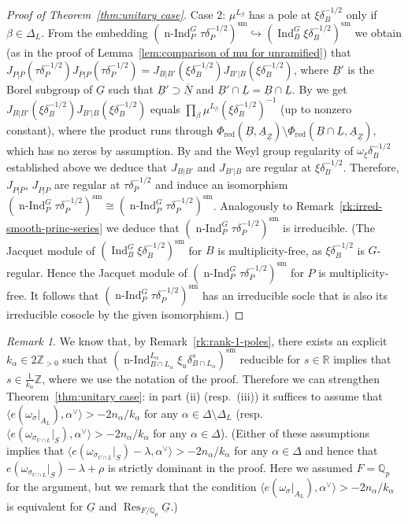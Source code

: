 \documentclass[a4paper]{amsart}
\numberwithin{equation}{section}
\theoremstyle{remark}
\newtheorem{remark}[thm]{Remark}
\theoremstyle{definition}
\DeclareMathOperator{\Ind}{Ind}
\DeclareMathOperator{\nInd}{n-Ind}
\DeclareMathOperator{\Res}{Res}
\newcommand{\Z}{\mathbb{Z}}
\newcommand{\Q}{\mathbb{Q}}
\newcommand{\R}{\mathbb{R}}
\newcommand{\sm}{\mathrm{sm}}
\newcommand{\alggrp}[1]{\underline{#1}}
\newcommand{\red}{\mathrm{red}}
\newcommand{\into}{\hookrightarrow}
\begin{document}
\begin{proof}[Proof of Theorem~\ref{thm:unitary case}]
  Case 2: $\mu^{L_\beta}$ has a pole at $\xi \delta_B^{-1/2}$ only if $\beta \in \Delta_L$.
  From the embedding $(\nInd_P^G \tau\delta_P^{-1/2})^\sm\into(\Ind_B^G \xi\delta_B^{-1/2})^\sm$ we obtain
  (as in the proof of Lemma~\ref{lem:comparison of mu for unramified}) that $J_{P|\overline P}(\tau\delta_P^{-1/2}) J_{\overline P|P}(\tau\delta_P^{-1/2}) = J_{B|B'}(\xi\delta_B^{-1/2})J_{B'|B}(\xi\delta_B^{-1/2})$,
  where $\alggrp B'$ is the Borel subgroup of $\alggrp G$ such that $\alggrp B' \supset \overline {\alggrp N}$ and $\alggrp B' \cap \alggrp L = \alggrp B \cap \alggrp L$.
  By \cite[IV.3(4)]{MR1989693} we get $J_{B|B'}(\xi\delta_B^{-1/2})J_{B'|B}(\xi\delta_B^{-1/2})$ equals $\prod_\beta \mu^{L_\beta}(\xi\delta_B^{-1/2})^{-1}$ (up to nonzero constant), where
  the product runs through $\Phi_\red(\alggrp B,\alggrp A_{\alggrp Z}) \setminus \Phi_\red(\alggrp B \cap \alggrp L,\alggrp A_{\alggrp Z})$, which has no zeros by assumption.
  By \cite[IV.1(13)]{MR1989693} and the Weyl group regularity of $\omega_\xi\delta_B^{-1/2}$ established above we deduce that $J_{B|B'}$ and $J_{B'|B}$ are regular at $\xi\delta_B^{-1/2}$.
  Therefore, $J_{P|\overline P}$, $J_{\overline P|P}$ are regular at $\tau\delta_P^{-1/2}$ and induce an isomorphism $(\nInd_P^G \tau\delta_P^{-1/2})^\sm \cong (\nInd_{\overline P}^G \tau\delta_P^{-1/2})^\sm$.
  Analogously to Remark~\ref{rk:irred-smooth-princ-series} we deduce that $(\nInd_P^G \tau\delta_P^{-1/2})^\sm$ is irreducible.
  (The Jacquet module of $(\Ind_B^G \xi\delta_B^{-1/2})^\sm$ for $B$ is multiplicity-free, as $\xi\delta_B^{-1/2}$ is $G$-regular.
  Hence the Jacquet module of $(\nInd_P^G \tau\delta_P^{-1/2})^\sm$ for $P$ is multiplicity-free.
  It follows that $(\nInd_P^G \tau\delta_P^{-1/2})^\sm$ has an irreducible socle that is also its irreducible cosocle by the given isomorphism.)
\end{proof}

\begin{remark}\label{rk:unitary-open-cone}
We know that, by Remark~\ref{rk:rank-1-poles}, there exists an explicit $k_{\alpha} \in 2\Z_{>0}$ such that $(\nInd_{B \cap L_{\alpha}}^{L_{\alpha}}\xi_u\delta_{B\cap L_{\alpha}}^{s})^\sm$ reducible for $s \in \R$ implies that $s\in \frac{1}{k_{\alpha}}\Z$, where we use the notation of the proof.
Therefore we can strengthen Theorem~\ref{thm:unitary case}:
in part (ii) (resp.\ (iii)) it suffices to assume that $\langle e(\omega_{\sigma}|_{A_L}),\alpha^{\vee}\rangle > -2n_{\alpha}/k_{\alpha}$ for any $\alpha \in \Delta\setminus \Delta_L$ (resp.\ $\langle e(\omega_{\sigma_{U \cap L}}|_{S}),\alpha^{\vee}\rangle > -2n_{\alpha}/k_{\alpha}$ for any $\alpha \in \Delta$).
(Either of these assumptions implies that $\langle e(\omega_{\sigma_{U \cap L}}|_{S})-\lambda,\alpha^{\vee}\rangle > -2n_{\alpha}/k_{\alpha}$ for any $\alpha \in \Delta$ and hence that $e(\omega_{\sigma_{U \cap L}}|_{S})-\lambda+\rho$ is strictly dominant in the proof.
Here we assumed $F = \Q_{p}$ for the argument, but we remark that the condition $\langle e(\omega_{\sigma}|_{A_L}),\alpha^{\vee}\rangle > -2n_{\alpha}/k_{\alpha}$ is equivalent for $\alggrp{G}$ and $\Res_{F/\Q_{p}}\alggrp{G}$.)
\end{remark}
\end{document}
